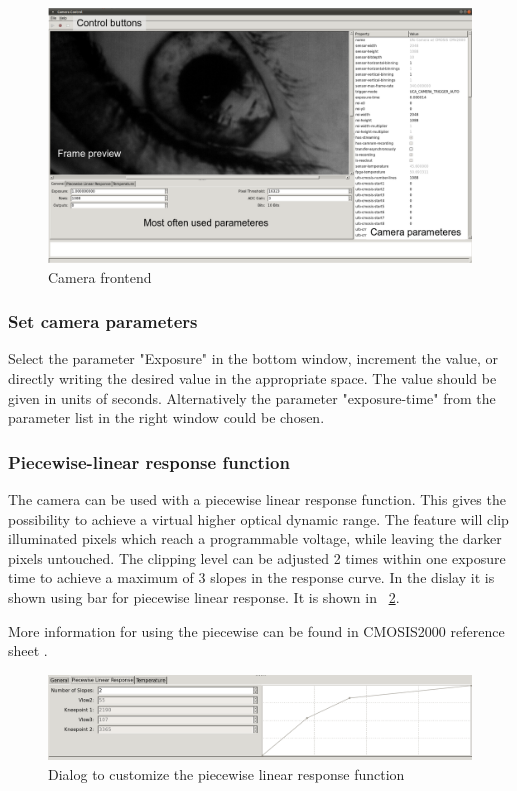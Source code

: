 \begin{figure}[h]
\includegraphics[width=\textwidth]{images/ufo_gui2.png}
\caption{\label{camera-gui} Camera frontend}
\end{figure}


\subsubsection{Set camera parameters}

Select the parameter "Exposure" in the bottom window, increment the value, or directly writing the desired value in the appropriate space. The value should be given in units of seconds. Alternatively the parameter "exposure-time" from the  parameter list in the right window could be chosen.

\subsubsection{Piecewise-linear response function}

The camera can be used with a piecewise linear response function. This gives the possibility to achieve a virtual higher optical dynamic range. The feature will clip illuminated pixels which reach a programmable voltage, while leaving the darker pixels untouched. The clipping level can be adjusted 2 times within one exposure time to achieve a maximum of 3 slopes in the response curve. In the dislay it is shown using bar for piecewise linear response. It is shown in  \figurename~\ref{ufo_gui_piecewise_bar}. 

More information for using the piecewise can be found in CMOSIS2000 reference sheet \cite{CMOSIS:CMV2000}.

\begin{figure}[h]
\centering
\includegraphics[width=1\textwidth]{images/ufo_gui_piecewise_bar.png}
\caption{\label{ufo_gui_piecewise_bar} Dialog to customize the piecewise linear response function}
\end{figure}

